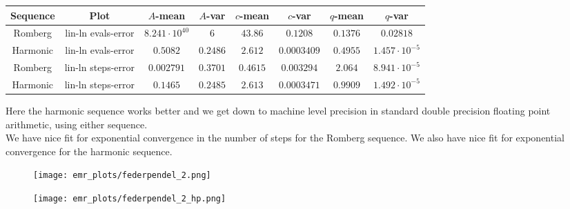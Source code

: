 \begin{table}[H]
    \centering
    \small
     \begin{tabular}{c|c||c|c|c|c|c|c}
Sequence & Plot & \(A\)-mean & \(A\)-var & \(c\)-mean & \(c\)-var & \(q\)-mean & \(q\)-var\\\hline
Romberg & lin-ln evals-error & \(8.241\cdot 10^{40}\) & \(6\) & \(43.86\) & \(0.1208\) & \(0.1376\) & \(0.02818\) \\
Harmonic & lin-ln evals-error & \(0.5082\) & \(0.2486\) & \(2.612\) & \(0.0003409\) & \(0.4955\) & \(1.457\cdot 10^{-5}\) \\
Romberg & lin-ln steps-error & \(0.002791\) & \(0.3701\) & \(0.4615\) & \(0.003294\) & \(2.064\) & \(8.941\cdot 10^{-5}\) \\
Harmonic & lin-ln steps-error & \(0.1465\) & \(0.2485\) & \(2.613\) & \(0.0003471\) & \(0.9909\) & \(1.492\cdot 10^{-5}\) \\
    \end{tabular}
    \label{tab:my_label}
\end{table}

Here the harmonic sequence works better and we get down to machine level precision in standard double precision floating point arithmetic, using either sequence.\\

We have nice fit for exponential convergence in the number of steps for the Romberg sequence. We also have nice fit for exponential convergence for the harmonic sequence.

\begin{figure}[H]
\centering
\begin{minipage}{0.45\textwidth}
\centering
\texttt{[image: emr\_plots/federpendel\_2.png]}
\end{minipage}
\begin{minipage}{0.45\textwidth}
\centering
\texttt{[image: emr\_plots/federpendel\_2\_hp.png]}
\end{minipage}
\end{figure}


